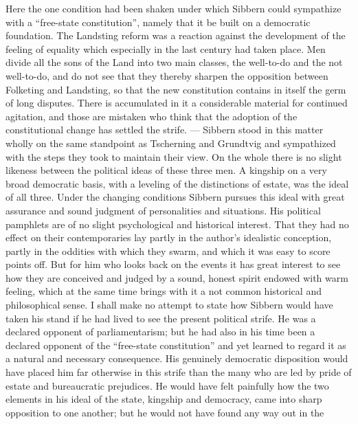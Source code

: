 \documentclass[12pt,a4paper,openany]{book}
\newcommand{\opage}[1]{\marginnote{\footnotesize\textit{[#1]}}}
\begin{document}
Here the one condition had been shaken under
which Sibbern could sympathize with a ``free-state constitution'',
namely that it be built on a democratic foundation.
The Landsting reform was a reaction against the development of
the feeling of equality which especially in the last century had taken
place. Men divide all the sons of the Land into two main classes,
the well-to-do and the not well-to-do, and do not see that
they thereby sharpen the opposition between Folketing and
Landsting, so that the new constitution contains in itself the germ of
long disputes. There is accumulated in it a considerable
material for continued agitation, and those are mistaken who think that
the adoption of the constitutional change has settled the strife. --- Sibbern
stood in this matter wholly on the same standpoint as
Tscherning and Grundtvig and sympathized with the steps they took
to maintain their view. On the whole there is no slight
likeness between the political ideas of these three men. A
kingship on a very broad democratic basis, with a leveling of
the distinctions of estate, was the ideal of all three. Under the changing
conditions Sibbern pursues this ideal with great assurance and
sound judgment of personalities and situations. His
political pamphlets are of no slight psychological and historical interest.
That they had no effect on their contemporaries lay partly in the author's
idealistic conception, partly in the oddities with which they swarm,
\opage{107}and which it was easy to score points off. But for him who looks
back on the events it has great interest to see
how they are conceived and judged by a sound, honest spirit endowed with
warm feeling, which at the same time brings with it a not
common historical and philosophical sense. I shall make no
attempt to state how Sibbern would have taken his stand
if he had lived to see the present political strife. He
was a declared opponent of parliamentarism; but he
had also in his time been a declared opponent of
the ``free-state constitution'' and yet learned to regard it as a
natural and necessary consequence. His genuinely democratic
disposition would have placed him far otherwise in this strife
than the many who are led by pride of estate and bureaucratic
prejudices. He would have felt painfully how the two
elements in his ideal of the state, kingship and democracy,
came into sharp opposition to one another; but he would not
have found any way out in the
\end{document}
